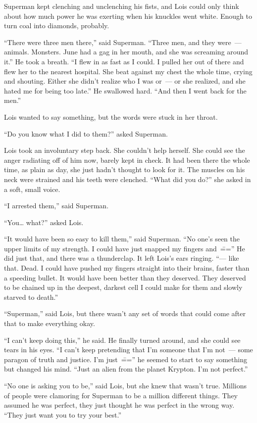 \documentclass[ebook,12pt]{memoir}
\begin{document}
Superman kept clenching and unclenching his fists, and Lois could only
think about how much power he was exerting when his knuckles went white.
Enough to turn coal into diamonds, probably.

``There were three men there,'' said Superman. ``Three men, and they
were~--- animals. Monsters. June had a gag in her mouth, and she was
screaming around it.'' He took a breath. ``I flew in as fast as I could.
I pulled her out of there and flew her to the nearest hospital. She beat
against my chest the whole time, crying and shouting. Either she didn't
realize who I was or~--- or she realized, and she hated me for being too
late.'' He swallowed hard. ``And then I went back for the men.''

Lois wanted to say something, but the words were stuck in her throat.

``Do you know what I did to them?'' asked Superman.

Lois took an involuntary step back. She couldn't help herself. She could
see the anger radiating off of him now, barely kept in check. It had
been there the whole time, as plain as day, she just hadn't thought to
look for it. The muscles on his neck were strained and his teeth were
clenched. ``What did you do?'' she asked in a soft, small voice.

``I arrested them,'' said Superman.

``You\ldots{} what?'' asked Lois.

``It would have been so easy to kill them,'' said Superman. ``No one's
seen the upper limits of my strength. I could have just snapped my
fingers and~\==='' He did just that, and there was a thunderclap. It left
Lois's ears ringing. ``--- like that. Dead. I could have pushed my
fingers straight into their brains, faster than a speeding bullet. It
would have been better than they deserved. They deserved to be chained
up in the deepest, darkest cell I could make for them and slowly starved
to death.''

``Superman,'' said Lois, but there wasn't any set of words that could
come after that to make everything okay.

``I can't keep doing this,'' he said. He finally turned around, and she
could see tears in his eyes. ``I can't keep pretending that I'm someone
that I'm not~--- some paragon of truth and justice. I'm just~\==='' he
seemed to start to say something but changed his mind. ``Just an alien
from the planet Krypton. I'm not perfect.''

``No one is asking you to be,'' said Lois, but she knew that wasn't
true. Millions of people were clamoring for Superman to be a million
different things. They assumed he was perfect, they just thought he was
perfect in the wrong way. ``They just want you to try your best.''
\end{document}
